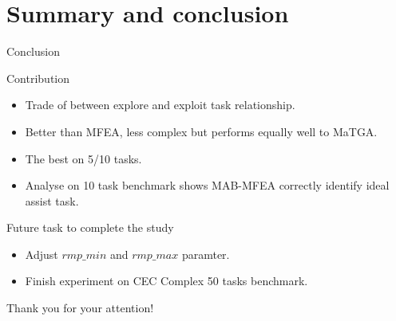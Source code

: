 \section*{Summary and conclusion}

\begin{frame}{Conclusion}
    \begin{block}{Contribution}
        \begin{itemize}
            \item Trade of between explore and exploit task relationship.
            \item Better than MFEA, less complex but performs equally well to MaTGA.
            \item The best on 5/10 tasks.
            \item Analyse on 10 task benchmark shows MAB-MFEA correctly identify ideal assist task.
        \end{itemize}
    \end{block}
    \begin{block}{Future task to complete the study}
        \begin{itemize}
            \item Adjust $rmp\_{min}$ and $rmp\_{max}$ paramter.
            \item Finish experiment on CEC Complex 50 tasks benchmark.
        \end{itemize}
    \end{block}
\end{frame}

\begin{frame}{}
    \centering \Huge Thank you for your attention!
\end{frame}